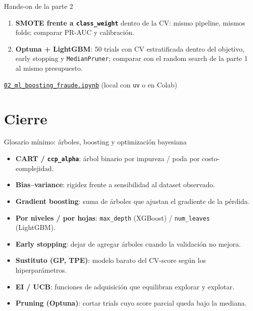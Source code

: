 \documentclass[aspectratio=169,12pt]{beamer}
\begin{document}
\begin{frame}{Hands-on de la parte 2}
  \small
  \begin{enumerate}
    \item \textbf{SMOTE frente a \texttt{class\_weight}} dentro de la CV: mismo pipeline, mismos folds; comparar PR-AUC y calibración.
    \item \textbf{Optuna + LightGBM}: 50 trials con CV estratificada dentro del objetivo, early stopping y \texttt{MedianPruner}; comparar con el random search de la parte 1 al mismo presupuesto.
  \end{enumerate}
  \vspace{6pt}
  \begin{toolbox}[Notebook]
    \href{https://github.com/anvasquezre/EAFIT_AA_2026-02/blob/main/notebooks/02_ml_boosting_fraude.ipynb}{\textcolor{eafitneon}{\underline{\texttt{02\_ml\_boosting\_fraude.ipynb}}}} (local con \texttt{uv} o en Colab)
  \end{toolbox}
\end{frame}

\section{Cierre}

\begin{frame}{Glosario mínimo: árboles, boosting y optimización bayesiana}
  \small
  \begin{itemize}
    \item \textbf{CART / \texttt{ccp\_alpha}}: árbol binario por impureza / poda por costo-complejidad.
    \item \textbf{Bias--variance}: rigidez frente a sensibilidad al dataset observado.
    \item \textbf{Gradient boosting}: suma de árboles que ajustan el gradiente de la pérdida.
    \item \textbf{Por niveles / por hojas}: \texttt{max\_depth} (XGBoost) / \texttt{num\_leaves} (LightGBM).
    \item \textbf{Early stopping}: dejar de agregar árboles cuando la validación no mejora.
    \item \textbf{Sustituto (GP, TPE)}: modelo barato del CV-score según los hiperparámetros.
    \item \textbf{EI / UCB}: funciones de adquisición que equilibran explorar y explotar.
    \item \textbf{Pruning (Optuna)}: cortar trials cuyo score parcial queda bajo la mediana.
  \end{itemize}
\end{frame}
\end{document}

